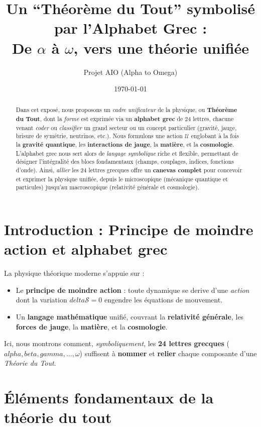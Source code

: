 \documentclass[12pt]{article}
\title{\textbf{Un ``Théorème du Tout'' symbolisé par l'Alphabet Grec :}\\
De \(\alpha\) à \(\omega\), vers une théorie unifiée}
\author{Projet AIO (Alpha to Omega)}
\date{\today}
\def\gamma{gamma}%
\def\delta{delta}%
\def\alpha{alpha}%
\def\beta{beta}%
\begin{document}
\maketitle

\begin{abstract}
Dans cet exposé, nous proposons un \emph{cadre unificateur} de la physique, ou 
\textbf{Théorème du Tout}, dont la \emph{forme} est exprimée via un \textbf{alphabet grec} 
de 24 lettres, chacune venant \emph{coder} ou \emph{classifier} un grand secteur 
ou un concept particulier (gravité, jauge, brisure de symétrie, neutrinos, etc.). 
Nous formulons une action \(\mathcal{U}\) englobant à la fois la \textbf{gravité quantique}, 
les \textbf{interactions de jauge}, la \textbf{matière}, et la \textbf{cosmologie}. 
L'alphabet grec nous sert alors de \emph{langage symbolique} riche et flexible, 
permettant de désigner l'intégralité des blocs fondamentaux (champs, couplages, indices, fonctions d'onde). 
Ainsi, \emph{allier} les 24 lettres grecques offre un \textbf{canevas complet} 
pour concevoir et exprimer la physique unifiée, depuis le microscopique 
(mécanique quantique et particules) jusqu'au macroscopique (relativité générale et cosmologie).
\end{abstract}

\tableofcontents

\section{Introduction : Principe de moindre action et alphabet grec}

La physique théorique moderne s'appuie sur :
\begin{itemize}
    \item Le \textbf{principe de moindre action} : toute dynamique se derive 
          d'une \emph{action} dont la variation \(\delta \mathcal{S}=0\) engendre les équations de mouvement.
    \item Un \textbf{langage mathématique} unifié, couvrant la \textbf{relativité générale}, 
          les \textbf{forces de jauge}, la \textbf{matière}, et la \textbf{cosmologie}.
\end{itemize}

Ici, nous montrons comment, \emph{symboliquement}, les \textbf{24 lettres grecques} 
(\(\alpha,\beta,\gamma,\dots,\omega\)) suffisent à \textbf{nommer} 
et \textbf{relier} chaque composante d'une \emph{Théorie du Tout}.

\section{Éléments fondamentaux de la théorie du tout}
\end{document}
